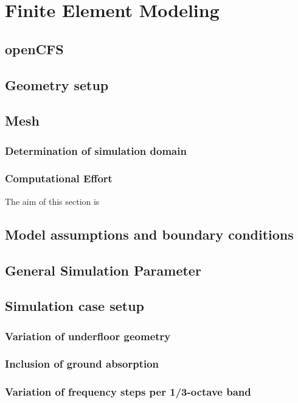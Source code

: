 \chapter{Finite Element Modeling}
\label{chap:FEM}

\section{openCFS}

\section{Geometry setup}

\section{Mesh}
\subsection{Determination of simulation domain}
\subsection{Computational Effort}
The aim of this section is 

\section{Model assumptions and boundary conditions}
\label{section:boundary_conditions}

\section{General Simulation Parameter}

\section{Simulation case setup}
\subsection{Variation of underfloor geometry}
\subsection{Inclusion of ground absorption}
\subsection{Variation of frequency steps per 1/3-octave band}